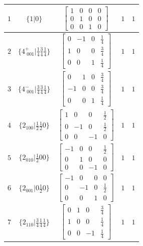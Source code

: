 \documentclass[fleqn,8pt]{jsarticle}
\begin{document}
\begin{longtable}{ccccc}
$ 1 $ & $ \{1|0\} $ & $ \begin{bmatrix} 1 & 0 & 0 & 0 \\ 0 & 1 & 0 & 0 \\ 0 & 0 & 1 & 0 \end{bmatrix} $ & $ 1 $ & $ 1 $ \\ \hline
$ 2 $ & $ \{4^{+}_{\,\,001}|\frac{1}{4} \frac{3}{4} \frac{1}{4}\} $ & $ \begin{bmatrix} 0 & -1 & 0 & \frac{1}{4} \\ 1 & 0 & 0 & \frac{3}{4} \\ 0 & 0 & 1 & \frac{1}{4} \end{bmatrix} $ & $ 1 $ & $ 1 $ \\ \hline
$ 3 $ & $ \{4^{-}_{\,\,001}|\frac{3}{4} \frac{3}{4} \frac{1}{4}\} $ & $ \begin{bmatrix} 0 & 1 & 0 & \frac{3}{4} \\ -1 & 0 & 0 & \frac{3}{4} \\ 0 & 0 & 1 & \frac{1}{4} \end{bmatrix} $ & $ 1 $ & $ 1 $ \\ \hline
$ 4 $ & $ \{2{}_{100}|\frac{1}{2} \frac{1}{2} 0\} $ & $ \begin{bmatrix} 1 & 0 & 0 & \frac{1}{2} \\ 0 & -1 & 0 & \frac{1}{2} \\ 0 & 0 & -1 & 0 \end{bmatrix} $ & $ 1 $ & $ 1 $ \\ \hline
$ 5 $ & $ \{2{}_{010}|\frac{1}{2} 0 0\} $ & $ \begin{bmatrix} -1 & 0 & 0 & \frac{1}{2} \\ 0 & 1 & 0 & 0 \\ 0 & 0 & -1 & 0 \end{bmatrix} $ & $ 1 $ & $ 1 $ \\ \hline
$ 6 $ & $ \{2{}_{001}|0 \frac{1}{2} 0\} $ & $ \begin{bmatrix} -1 & 0 & 0 & 0 \\ 0 & -1 & 0 & \frac{1}{2} \\ 0 & 0 & 1 & 0 \end{bmatrix} $ & $ 1 $ & $ 1 $ \\ \hline
$ 7 $ & $ \{2{}_{110}|\frac{3}{4} \frac{1}{4} \frac{1}{4}\} $ & $ \begin{bmatrix} 0 & 1 & 0 & \frac{3}{4} \\ 1 & 0 & 0 & \frac{1}{4} \\ 0 & 0 & -1 & \frac{1}{4} \end{bmatrix} $ & $ 1 $ & $ 1 $ \\ \hline

\end{longtable}
\end{document}
